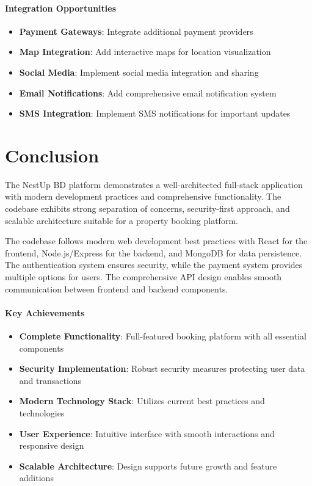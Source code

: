 \documentclass[12pt,a4paper]{article}
\begin{document}
\paragraph{Integration Opportunities}
\begin{itemize}
\item \textbf{Payment Gateways}: Integrate additional payment providers
\item \textbf{Map Integration}: Add interactive maps for location visualization
\item \textbf{Social Media}: Implement social media integration and sharing
\item \textbf{Email Notifications}: Add comprehensive email notification system
\item \textbf{SMS Integration}: Implement SMS notifications for important updates
\end{itemize}

\section{Conclusion}
\label{sec:conclusion}

The NestUp BD platform demonstrates a well-architected full-stack application with modern development practices and comprehensive functionality. The codebase exhibits strong separation of concerns, security-first approach, and scalable architecture suitable for a property booking platform.

The codebase follows modern web development best practices with React
for the frontend, Node.js/Express for the backend, and MongoDB for data
persistence. The authentication system ensures security, while the
payment system provides multiple options for users. The comprehensive
API design enables smooth communication between frontend and backend
components.

\paragraph{Key Achievements}
\begin{itemize}
\item \textbf{Complete Functionality}: Full-featured booking platform with all essential components
\item \textbf{Security Implementation}: Robust security measures protecting user data and transactions
\item \textbf{Modern Technology Stack}: Utilizes current best practices and technologies
\item \textbf{User Experience}: Intuitive interface with smooth interactions and responsive design
\item \textbf{Scalable Architecture}: Design supports future growth and feature additions
\end{itemize}
\end{document}
